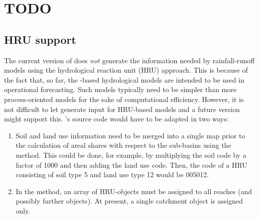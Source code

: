 \section{TODO} \label{sec:topocatch:todo}

\subsection{HRU support} \label{sec:topocatch:todos-hru}
The current version of  does \emph{not} generate the information needed by rainfall-runoff models using the hydrological reaction unit (HRU) approach. This is because of the fact that, so far, the -based hydrological models are intended to be used in operational forecasting. Such models typically need to be simpler than more process-oriented models for the sake of computational efficiency. However, it is not difficult to let  generate input for HRU-based models and a future version might support this. 's source code would have to be adapted in two ways:
\begin{enumerate}
  \item Soil and land use information need to be merged into a single map prior to the calculation of areal shares with respect to the sub-basins using the  method. This could be done, for example, by multiplying the soil code by a factor of 1000 and then adding the land use code. Then, the code of a HRU consisting of soil type 5 and land use type 12 would be 005012.
  \item In the  method, an array of HRU-objects must be assigned to all reaches (and possibly further objects). At present, a single catchment object is assigned only.
\end{enumerate}
